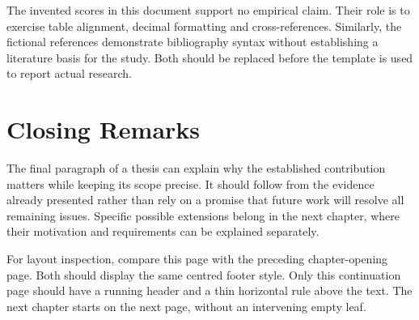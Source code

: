 The invented scores in this document support no empirical claim. Their role
is to exercise table alignment, decimal formatting and cross-references.
Similarly, the fictional references demonstrate bibliography syntax without
establishing a literature basis for the study. Both should be replaced before
the template is used to report actual research.

\section{Closing Remarks}
The final paragraph of a thesis can explain why the established contribution
matters while keeping its scope precise. It should follow from the evidence
already presented rather than rely on a promise that future work will resolve
all remaining issues. Specific possible extensions belong in the next chapter,
where their motivation and requirements can be explained separately.

For layout inspection, compare this page with the preceding chapter-opening
page. Both should display the same centred footer style. Only this continuation
page should have a running header and a thin horizontal rule above the text.
The next chapter starts on the next page, without an intervening empty leaf.
